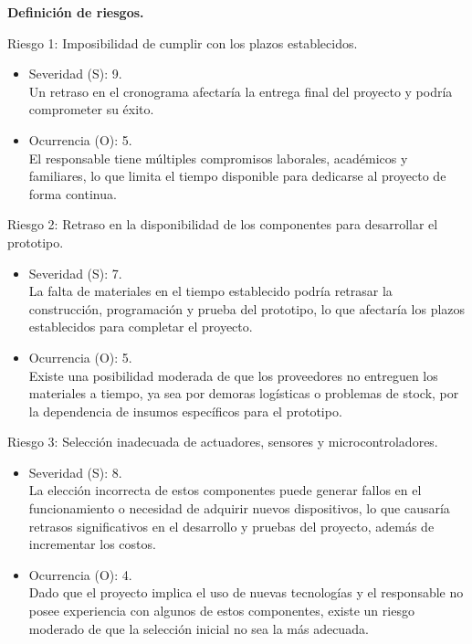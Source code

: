 \textbf{Definición de riesgos.}

Riesgo 1: Imposibilidad de cumplir con los plazos establecidos.
\begin{itemize}
	\item Severidad (S): 9.\\ Un retraso en el cronograma afectaría la entrega final del
	      proyecto y podría comprometer su éxito.
	\item Ocurrencia (O): 5.\\ El responsable tiene múltiples compromisos laborales,
	      académicos y familiares, lo que limita el tiempo disponible para dedicarse al
	      proyecto de forma continua.
\end{itemize}

Riesgo 2: Retraso en la disponibilidad de los componentes para desarrollar el
prototipo.
\begin{itemize}
	\item Severidad (S): 7.\\ La falta de materiales en el tiempo establecido podría
	      retrasar la construcción, programación y prueba del prototipo, lo que afectaría
	      los plazos establecidos para completar el proyecto.
	\item Ocurrencia (O): 5.\\ Existe una posibilidad moderada de que los proveedores no
	      entreguen los materiales a tiempo, ya sea por demoras logísticas o problemas de
	      stock, por la dependencia de insumos específicos para el prototipo.
\end{itemize}

Riesgo 3: Selección inadecuada de actuadores, sensores y microcontroladores.
\begin{itemize}
	\item Severidad (S): 8.\\ La elección incorrecta de estos componentes puede generar
	      fallos en el funcionamiento o necesidad de adquirir nuevos dispositivos, lo que
	      causaría retrasos significativos en el desarrollo y pruebas del proyecto,
	      además de incrementar los costos.
	\item Ocurrencia (O): 4.\\ Dado que el proyecto implica el uso de nuevas tecnologías
	      y el responsable no posee experiencia con algunos de estos componentes, existe
	      un riesgo moderado de que la selección inicial no sea la más adecuada.
\end{itemize}

